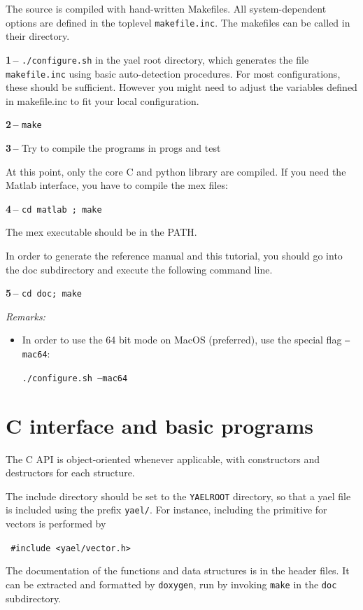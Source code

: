 \documentclass[a4paper,11pt,notitlepage,final,twoside]{report}
\newcommand{\yroot}{\texttt{YAELROOT}\xspace}
\newcommand{\tc}[1]{\texttt{#1}}
\newcommand{\code}[1]{\smallskip 

\texttt{#1} 
 \medskip

}
\begin{document}
The source is compiled with hand-written Makefiles. 
All system-dependent options are defined in the toplevel \tc{makefile.inc}. 
The makefiles can be called in their directory.
\bigskip

{\bf 1\,--} \tc{./configure.sh} in the yael root directory, which generates 
the file \tc{makefile.inc} using basic auto-detection procedures. 
For most configurations, these should be sufficient. However you might need 
to adjust the variables defined in makefile.inc to fit your local configuration. 
\bigskip

{\bf 2\,--} \tc{make}
\bigskip

{\bf 3\,--} Try to compile the programs in progs and test
\medskip

At this point, only the core C and python library are compiled. 
If you need the Matlab interface, you have to compile the mex files:
\bigskip

{\bf 4\,--} \tc{cd matlab ; make}
\smallskip

The mex executable should be in the PATH. 
\bigskip

In order to generate the reference manual and this tutorial, you should go into the 
doc subdirectory and execute the following command line. 
\smallskip

{\bf 5\,--} \tc{cd doc; make}
\bigskip

{\it Remarks:}
\begin{itemize}
\item In order to use the 64 bit mode on MacOS (preferred), 
use the special flag \tc{--mac64}: 
\code{./configure.sh --mac64}
\end{itemize}


\chapter{C interface and basic programs}

The C API is object-oriented whenever applicable, with constructors and destructors for each structure. 
\medskip

The include directory should be set to the \yroot directory, so that a yael file is included using the prefix \texttt{yael/}. 
For instance, including the primitive for vectors is performed by
\code{
\#include <yael/vector.h>
}
\medskip

The documentation of the functions and data structures is in the header files. It can be extracted and formatted by \texttt{doxygen}, run by invoking \texttt{make} in the \texttt{doc} subdirectory. 
\medskip
\end{document}
